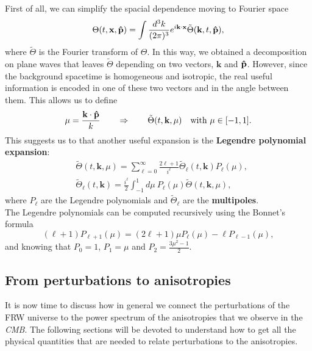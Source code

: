 First of all, we can simplify the spacial dependence moving to Fourier space
\begin{equation}\label{eq:fourier_expansion}
    \Theta(t,\mathbf x,\mathbf{\hat{p}}) = \int \frac{d^3k}{(2\pi)^3}e^{i\mathbf{k}\cdot\mathbf{x}}\tilde\Theta(\mathbf{k},t,\mathbf{\hat{p}}),
\end{equation} 
where $\tilde\Theta$ is the Fourier transform of $\Theta$.
In this way, we obtained a decomposition on plane waves that leaves $\tilde\Theta$ depending on two vectors, $\mathbf k$ and $\mathbf{\hat{p}}$. However, since the background spacetime is homogeneous and isotropic, the real useful information is encoded in one of these two vectors and in the angle between them. This allows us to define $$\mu=\frac{\mathbf{k}\cdot \mathbf{\hat{p}}}{k}\qquad\Rightarrow\qquad \tilde\Theta(t,\mathbf k,\mu)\quad \text{with } \mu\in[-1,1].$$
This suggests us to that another useful expansion is the \textbf{Legendre polynomial expansion}:
\begin{align}\label{eq:legendre_expansion}
    &\tilde\Theta(t,\mathbf k,\mu) = \sum_{\ell=0}^{\infty}\frac{2\ell+1}{i^\ell} \tilde\Theta_{\ell}(t,\mathbf{k})P_{\ell}(\mu),\\
    &\tilde\Theta_{\ell}(t,\mathbf{k}) =\frac{i^\ell}{2} \int_{-1}^{1}d\mu\ P_{\ell}(\mu)\tilde\Theta(t,\mathbf k,\mu)\nonumber,
\end{align} 
where $P_{\ell}$ are the Legendre polynomials and $\tilde\Theta_\ell$ are the \textbf{multipoles}.\\
The Legendre polynomials can be computed recursively using the Bonnet's formula
\begin{equation}\label{eq:bonnet}
    (\ell+1)P_{\ell+1}(\mu) = (2\ell+1)\mu P_{\ell}(\mu)-\ell P_{\ell-1}(\mu),
\end{equation}
and knowing that $P_0=1$, $P_1=\mu$ and $P_2=\frac{3\mu^2-1}{2}$.
\subsection{From perturbations to anisotropies}\label{sec:PertToAnis}
It is now time to discuss how in general we connect the perturbations of the FRW universe to the power spectrum of the anisotropies that we observe in the \emph{CMB}. The following sections will be devoted to understand how to get all the physical quantities that are needed to relate perturbations to the anisotropies.\\

